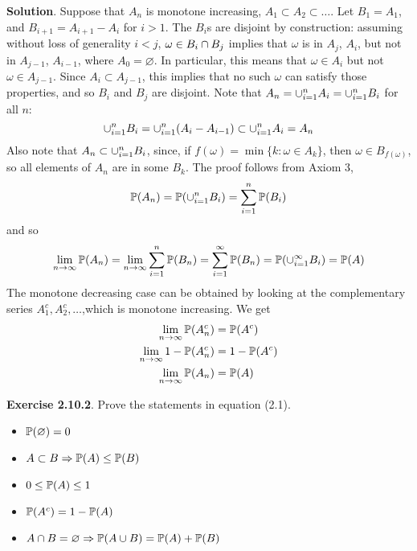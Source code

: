\textbf{Solution}.
Suppose that \(A_{n}\) is monotone increasing, \(A_{1} \subset A_{2} \subset \dots\). Let \(B_{1} = A_{1}\), and \(B_{i+1} = A_{i+1} - A_{i}\) for \(i > 1\).
The \(B_{i}\)s are disjoint by construction: assuming without loss of generality \(i < j\), \(\omega \in B_{i} \cap B_{j}\) implies that \(\omega\) is in \(A_{j}\), \(A_{i}\), but not in \(A_{j - 1}\), \(A_{i - 1}\), where \(A_{0} = \varnothing\). In particular, this means that \(\omega \in A_{i}\) but not \(\omega \in A_{j - 1}\). Since \(A_{i} \subset A_{j - 1}\), this implies that no such \(\omega\) can satisfy those properties, and so \(B_{i}\) and \(B_{j}\) are disjoint.
Note that \(A_{n} = \cup_{i=1}^{n} A_{i} = \cup_{i=1}^{n} B_{i}\) for all \(n\):
\[
\cup_{i=1}^{n} B_{i} = \cup_{i=1}^{n} (A_{i} - A_{i - 1}) \subset \cup_{i=1}^{n} A_{i} = A_{n}
\]
Also note that \(A_{n} \subset \cup_{i=1}^{n} B_{i}\), since, if
 \(f(\omega) = \min \{ k : \omega \in A_{k} \}\), then \(\omega \in B_{f(\omega)}\), so all elements of \(A_{n}\) are in some \(B_{k}\).
The proof follows from Axiom 3,
\[
\PROB(A_{n}) = \PROB\left( \union_{i=1}^{n} B_{i} \right) = \sum_{i=1}^{n} \PROB(B_{i})
\]
and so
\[
\lim_{n \rightarrow \infty} \PROB(A_{n}) = \lim_{n \rightarrow \infty} \sum_{i=1}^{n} \PROB(B_{n}) = \sum_{i=1}^{\infty} \PROB(B_{n}) = \PROB\left( \union_{i=1}^{\infty} B_{i} \right) = \PROB(A)
\]
The monotone decreasing case can be obtained by looking at the complementary series \(A_{1}^{c}, A_{2}^{c}, \dots\),which is monotone increasing. We get
\begin{align*}
\lim_{n \rightarrow \infty} \operatorname{\mathbb{P}}(A_{n}^{c}) 
&= \operatorname{\mathbb{P}}(A^{c}) 
\\
\lim_{n \rightarrow \infty} 1 - \operatorname{\mathbb{P}}(A_{n}^{c}) 
&= 1 - \operatorname{\mathbb{P}}(A^{c}) 
\\
\lim_{n \rightarrow \infty} \operatorname{\mathbb{P}}(A_{n}) 
&= \operatorname{\mathbb{P}}(A)
\end{align*}

\textbf{Exercise 2.10.2}. Prove the statements in equation (2.1).
\begin{itemize}[tightlist]
\item
  \(\operatorname{\mathbb{P}}(\varnothing) = 0\)
\item
  \(A \subset B \Rightarrow \operatorname{\mathbb{P}}(A) \leq \operatorname{\mathbb{P}}(B)\)
\item
  \(0 \leq \operatorname{\mathbb{P}}(A) \leq 1\)
\item
  \(\PROB\left(A^{c}\right) = 1 - \PROB(A)\)
\item
  \(A \cap B = \varnothing \Rightarrow \operatorname{\mathbb{P}}(A \cup B) = \operatorname{\mathbb{P}}(A) + \operatorname{\mathbb{P}}(B)\)
\end{itemize}

